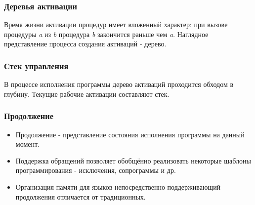 \documentclass[16pt,pdf,unicode]{beamer}
\begin{document}
\begin{frame}
\frametitle{Деревья активации}
Время жизни активации процедур имеет вложенный характер: при вызове процедуры \textit{a} из \textit{b} процедура \textit{b} закончится раньше чем \textit{a}.
Наглядное представление процесса создания активаций - дерево.
\begin{center}
\begin{figure}
\end{figure}
\end{center}
\end{frame}

\begin{frame}
\frametitle{Стек управления}
В процессе исполнения программы дерево активаций проходится обходом в глубину. Текущие рабочие активации составляют стек.
\begin{center}
\begin{figure}
\end{figure}
\end{center}
\end{frame}

\begin{frame}
\frametitle{Продолжение}
\begin{itemize}
  \item Продолжение  - представление состояния исполнения программы на данный момент.
  \item Поддержка обращений позволяет обобщённо реализовать некоторые шаблоны программирования - исключения, сопрограммы и др.
  \item Организация памяти для языков непосредственно поддерживающий продолжения отличается от традиционных.
\end{itemize}
\end{frame}
\end{document}
